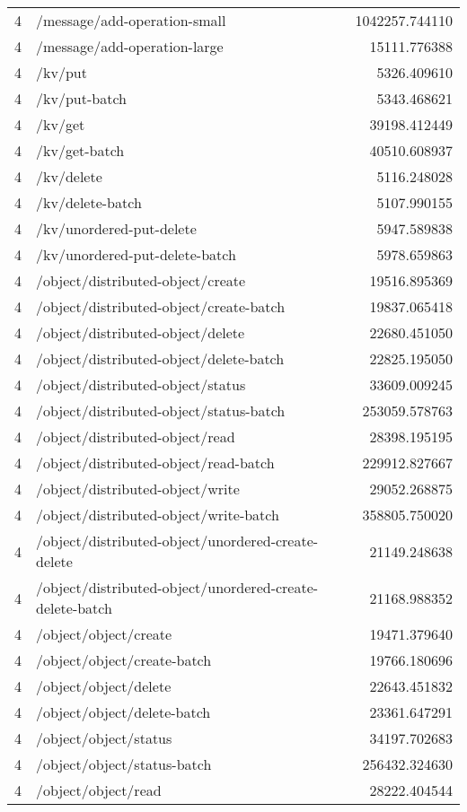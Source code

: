 \begin{longtable}{rlr}
4 & /message/add-operation-small & 1042257.744110 \\
4 & /message/add-operation-large & 15111.776388 \\
4 & /kv/put & 5326.409610 \\
4 & /kv/put-batch & 5343.468621 \\
4 & /kv/get & 39198.412449 \\
4 & /kv/get-batch & 40510.608937 \\
4 & /kv/delete & 5116.248028 \\
4 & /kv/delete-batch & 5107.990155 \\
4 & /kv/unordered-put-delete & 5947.589838 \\
4 & /kv/unordered-put-delete-batch & 5978.659863 \\
4 & /object/distributed-object/create & 19516.895369 \\
4 & /object/distributed-object/create-batch & 19837.065418 \\
4 & /object/distributed-object/delete & 22680.451050 \\
4 & /object/distributed-object/delete-batch & 22825.195050 \\
4 & /object/distributed-object/status & 33609.009245 \\
4 & /object/distributed-object/status-batch & 253059.578763 \\
4 & /object/distributed-object/read & 28398.195195 \\
4 & /object/distributed-object/read-batch & 229912.827667 \\
4 & /object/distributed-object/write & 29052.268875 \\
4 & /object/distributed-object/write-batch & 358805.750020 \\
4 & /object/distributed-object/unordered-create-delete & 21149.248638 \\
4 & /object/distributed-object/unordered-create-delete-batch & 21168.988352 \\
4 & /object/object/create & 19471.379640 \\
4 & /object/object/create-batch & 19766.180696 \\
4 & /object/object/delete & 22643.451832 \\
4 & /object/object/delete-batch & 23361.647291 \\
4 & /object/object/status & 34197.702683 \\
4 & /object/object/status-batch & 256432.324630 \\
4 & /object/object/read & 28222.404544 \\

\end{longtable}
